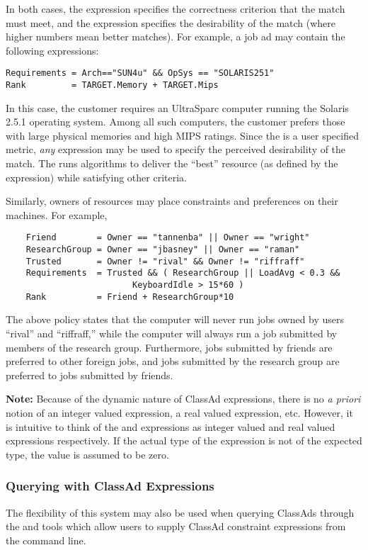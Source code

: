 In both cases, the  expression specifies the correctness
criterion that the match must meet, and the  expression specifies
the desirability of the match (where higher numbers mean better matches).
For example, a job ad may contain the following expressions:
\begin{verbatim}
Requirements = Arch=="SUN4u" && OpSys == "SOLARIS251"
Rank         = TARGET.Memory + TARGET.Mips
\end{verbatim}
In this case, the customer requires an UltraSparc computer running the Solaris 
2.5.1 operating system.  Among all such computers, the customer prefers those
with large physical memories and high MIPS ratings.  Since the  is
a user specified metric, \emph{any} expression may be used to specify the
perceived desirability of the match.  The  runs algorithms
to deliver the ``best'' resource (as defined by the  expression)
while satisfying other criteria.

Similarly, owners of resources may place constraints and preferences on 
their machines.  For example,
\begin{verbatim}
    Friend        = Owner == "tannenba" || Owner == "wright"
    ResearchGroup = Owner == "jbasney" || Owner == "raman"
    Trusted       = Owner != "rival" && Owner != "riffraff"
    Requirements  = Trusted && ( ResearchGroup || LoadAvg < 0.3 &&
                         KeyboardIdle > 15*60 )
    Rank          = Friend + ResearchGroup*10
\end{verbatim}
The above policy states that the computer will never run jobs owned by
users ``rival'' and ``riffraff,'' while the computer will always run a 
job submitted by members of the research group.  Furthermore, jobs
submitted by friends are preferred to other foreign jobs, and jobs submitted
by the research group are preferred to jobs submitted by friends. 

\textbf{Note:}  Because of the dynamic nature of ClassAd expressions, there
is no \emph{a priori} notion of an integer valued expression, a real valued
expression, etc.  However, it is intuitive to think of the 
and  expressions as integer valued and real valued expressions
respectively.  If the actual type of the expression is not of the expected 
type, the value is assumed to be zero.

\subsubsection{Querying with ClassAd Expressions}
The flexibility of this system may also be used when querying ClassAds
through the  and  tools which allow users to
supply ClassAd constraint expressions from the command line.

